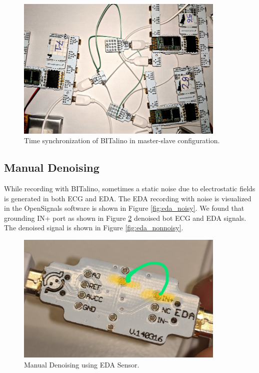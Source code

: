 \begin{figure}
\centering
\includegraphics[width=100mm]{Figures/time_syn_bitalino.jpg}
\caption{Time synchronization of BITalino in master-slave configuration.}
\label{fig:time_sync_bitalino}
\end{figure}
\subsection{Manual Denoising}
\label{sec:denoising}
While recording with BITalino, sometimes a static noise due to electrostatic fields is generated in both ECG and EDA. The EDA recording with noise is visualized in the OpenSignals software is shown in Figure \ref{fig:eda_noisy}. We found that grounding IN+ port as shown in Figure \ref{fig:eda_denoising} denoised bot ECG and EDA signals. The denoised signal is shown in Figure \ref{fig:eda_nonnoisy}.


\begin{figure}
\centering
\includegraphics[width=100mm]{Figures/eda_denoising.jpeg}
\caption{Manual Denoising using EDA Sensor.}
\label{fig:eda_denoising}
\end{figure}

